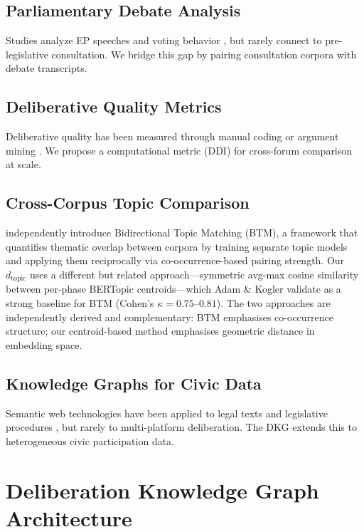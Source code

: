 \documentclass[sigconf,natbib]{acmart}
\begin{document}
\subsection{Parliamentary Debate Analysis}
Studies analyze EP speeches \citep{Abercrombie2020} and voting behavior \citep{Hix2006}, but rarely connect to pre-legislative consultation. We bridge this gap by pairing consultation corpora with debate transcripts.

\subsection{Deliberative Quality Metrics}
Deliberative quality has been measured through manual coding \citep{Steenbergen2003} or argument mining \citep{Lawrence2020}. We propose a computational metric (DDI) for cross-forum comparison at scale.

\subsection{Cross-Corpus Topic Comparison}
\citet{Adam2024} independently introduce Bidirectional Topic Matching (BTM), a framework that quantifies thematic overlap between corpora by training separate topic models and applying them reciprocally via co-occurrence-based pairing strength.
Our $d_{\text{topic}}$ uses a different but related approach---symmetric avg-max cosine similarity between per-phase BERTopic centroids---which Adam \& Kogler validate as a strong baseline for BTM (Cohen's $\kappa = 0.75$--$0.81$).
The two approaches are independently derived and complementary: BTM emphasises co-occurrence structure; our centroid-based method emphasises geometric distance in embedding space.

\subsection{Knowledge Graphs for Civic Data}
Semantic web technologies have been applied to legal texts \citep{Palmirani2018} and legislative procedures \citep{Mader2012}, but rarely to multi-platform deliberation. The DKG extends this to heterogeneous civic participation data.

\section{Deliberation Knowledge Graph Architecture}
\end{document}

